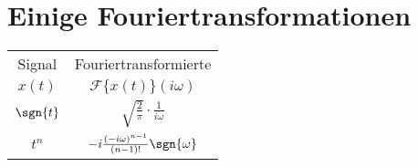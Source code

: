 \section{Einige Fouriertransformationen}\label{ft:tab}
\begin{center}
\begin{tabular}{|c|c|}
\hline
\rule[-1ex]{0pt}{2.5ex} Signal & Fouriertransformierte \\  
\rule[-1ex]{0pt}{2.5ex} $x(t)$ & $\mathscr{F}\{x(t)\}(i \omega)$ \\
\hline  
\rule[-1ex]{0pt}{2.5ex} $\sgn{t}$ & $\sqrt{\frac{2}{\pi}} \cdot \frac{1}{i \omega} $ \\ 
\hline
\rule[-1ex]{0pt}{2.5ex} $t^n$ & $- i \frac{(-i \omega)^{n-1}}{(n-1)!}\sgn{\omega}$\\ 
\hline 
\end{tabular} 
\end{center} 

